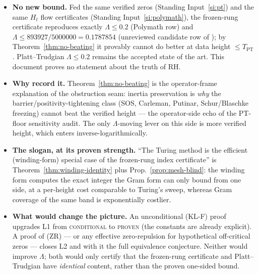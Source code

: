 \documentclass[11pt]{article}
\theoremstyle{definition}
\theoremstyle{remark}
\newcommand{\TPT}{T_{\mathrm{PT}}}
\begin{document}
\begin{itemize}
\item \textbf{No new bound.} Fed the same verified zeros (Standing
Input~\ref{si:pt}) and the same $H_t$ flow certificates (Standing
Input~\ref{si:polymath}), the frozen-rung certificate reproduces exactly
$\Lambda\le0.2$ (Polymath row) and $\Lambda\le893927/5000000=0.1787854$
(unreviewed candidate row of \cite{ProofNote}); by
Theorem~\ref{thm:no-beating} it provably cannot do better at data height
$\le\TPT$. Platt--Trudgian $\Lambda\le0.2$ remains the accepted state of the
art. This document proves no statement about the truth of RH.
\item \textbf{Why record it.} Theorem~\ref{thm:no-beating} is the
operator-frame explanation of the obstruction seam: inertia preservation is
\emph{why} the barrier/positivity-tightening class (SOS, Carleman, Putinar,
Schur/Blaschke freezing) cannot beat the verified height --- the
operator-side echo of the PT-floor sensitivity audit. The only
$\Lambda$-moving lever on this side is more verified height, which enters
inverse-logarithmically.
\item \textbf{The slogan, at its proven strength.} ``The Turing method is
the efficient (winding-form) special case of the frozen-rung index
certificate'' is Theorem~\ref{thm:winding-identity} plus
Prop.~\ref{prop:mesh-blind}: the winding form computes the exact integer the
Gram form can only bound from one side, at a per-height cost comparable to
Turing's sweep, whereas Gram coverage of the same band is exponentially
costlier.
\item \textbf{What would change the picture.} An unconditional (KL-F) proof
upgrades L1 from \textsc{conditional} to \textsc{proven} (the constants are
already explicit). A proof of (ZR) --- or any effective zero-repulsion for
hypothetical off-critical zeros --- closes L2 and with it the full
equivalence conjecture. Neither would improve $\Lambda$; both would only
certify that the frozen-rung certificate and Platt--Trudgian have
\emph{identical} content, rather than the proven one-sided bound.
\end{itemize}
\end{document}
